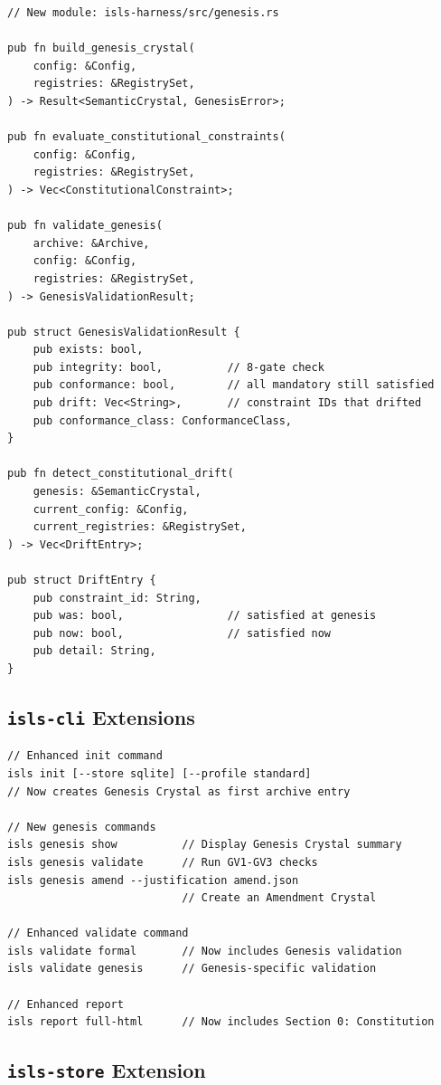 \documentclass[11pt,a4paper,twoside]{article}
\theoremstyle{definition}
\theoremstyle{plain}
\theoremstyle{remark}
\begin{document}
\begin{lstlisting}
// New module: isls-harness/src/genesis.rs

pub fn build_genesis_crystal(
    config: &Config,
    registries: &RegistrySet,
) -> Result<SemanticCrystal, GenesisError>;

pub fn evaluate_constitutional_constraints(
    config: &Config,
    registries: &RegistrySet,
) -> Vec<ConstitutionalConstraint>;

pub fn validate_genesis(
    archive: &Archive,
    config: &Config,
    registries: &RegistrySet,
) -> GenesisValidationResult;

pub struct GenesisValidationResult {
    pub exists: bool,
    pub integrity: bool,          // 8-gate check
    pub conformance: bool,        // all mandatory still satisfied
    pub drift: Vec<String>,       // constraint IDs that drifted
    pub conformance_class: ConformanceClass,
}

pub fn detect_constitutional_drift(
    genesis: &SemanticCrystal,
    current_config: &Config,
    current_registries: &RegistrySet,
) -> Vec<DriftEntry>;

pub struct DriftEntry {
    pub constraint_id: String,
    pub was: bool,                // satisfied at genesis
    pub now: bool,                // satisfied now
    pub detail: String,
}
\end{lstlisting}

\subsection{\texttt{isls-cli} Extensions}

\begin{lstlisting}
// Enhanced init command
isls init [--store sqlite] [--profile standard]
// Now creates Genesis Crystal as first archive entry

// New genesis commands
isls genesis show          // Display Genesis Crystal summary
isls genesis validate      // Run GV1-GV3 checks
isls genesis amend --justification amend.json
                           // Create an Amendment Crystal

// Enhanced validate command
isls validate formal       // Now includes Genesis validation
isls validate genesis      // Genesis-specific validation

// Enhanced report
isls report full-html      // Now includes Section 0: Constitution
\end{lstlisting}

\subsection{\texttt{isls-store} Extension}
\end{document}
